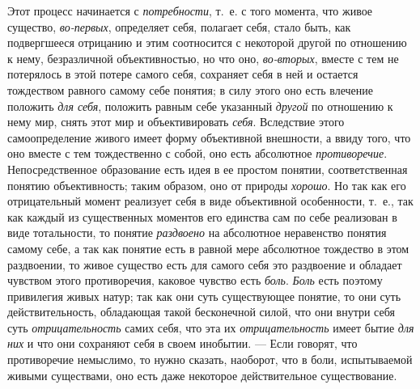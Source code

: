 \documentclass[twoside]{article}
\begin{document}
{{{Этот процесс начинается с
{\em потребности}, т.~е.
с того момента, что живое существо,
{\em во-первых},
определяет себя, полагает себя, стало быть, как подвергшееся
отрицанию и этим соотносится с некоторой другой по отношению к нему,
безразличной объективностью, но что оно,
{\em во-вторых}, вместе с
тем не потерялось в этой потере самого себя, сохраняет себя в ней и
остается тождеством равного самому себе понятия; в силу этого оно есть
влечение положить {\em для себя},
положить равным себе указанный
{\em другой} по отношению
к нему мир, снять этот мир и объективировать
{\em себя}. Вследствие
этого самоопределение живого имеет форму объективной внешности, а ввиду
того, что оно вместе с тем тождественно с собой, оно есть абсолютное
{\em противоречие}.
Непосредственное образование есть идея в ее простом понятии,
соответственная понятию объективность; таким образом, оно от природы
{\em хорошо}. Но так как
его отрицательный момент реализует себя в виде объективной особенности,
т.~е., так как каждый из существенных моментов его единства сам по себе
реализован в виде тотальности, то понятие
{\em раздвоено} на
абсолютное неравенство понятия самому себе, а так как понятие есть в равной
мере абсолютное тождество в этом раздвоении, то живое существо есть для
самого себя это раздвоение и обладает чувством этого противоречия, каковое
чувство есть {\em боль}.
{\em Боль} есть поэтому
привилегия живых натур; так как они суть существующее понятие, то они суть
действительность, обладающая такой бесконечной силой, что они внутри себя
суть {\em отрицательность}
самих себя, что эта их
{\em отрицательность}
имеет бытие {\em для них}
и что они сохраняют себя в своем инобытии. —
Если говорят, что противоречие немыслимо, то нужно сказать,
наоборот, что в боли, испытываемой живыми существами, оно есть даже
некоторое действительное существование.

}}}
\end{document}
